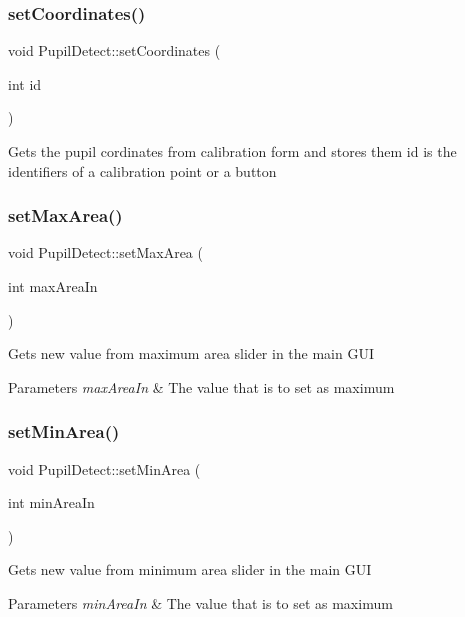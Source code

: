 \subsubsection{\texorpdfstring{set\+Coordinates()}{setCoordinates()}}
{\footnotesize\ttfamily void Pupil\+Detect\+::set\+Coordinates (\begin{DoxyParamCaption}\item[{int}]{id }\end{DoxyParamCaption})}

Gets the pupil cordinates from calibration form and stores them id is the identifiers of a calibration point or a button \mbox{\label{class_pupil_detect_a38b91dc58b1a408e7ca081dac2c208bb}} 
\subsubsection{\texorpdfstring{set\+Max\+Area()}{setMaxArea()}}
{\footnotesize\ttfamily void Pupil\+Detect\+::set\+Max\+Area (\begin{DoxyParamCaption}\item[{int}]{max\+Area\+In }\end{DoxyParamCaption})}

Gets new value from maximum area slider in the main G\+UI 
\begin{DoxyParams}{Parameters}
{\em max\+Area\+In} & The value that is to set as maximum \\
\hline
\end{DoxyParams}
\mbox{\label{class_pupil_detect_aa933cccabd0866e4fa1aee000532cb29}} 
\subsubsection{\texorpdfstring{set\+Min\+Area()}{setMinArea()}}
{\footnotesize\ttfamily void Pupil\+Detect\+::set\+Min\+Area (\begin{DoxyParamCaption}\item[{int}]{min\+Area\+In }\end{DoxyParamCaption})}

Gets new value from minimum area slider in the main G\+UI 
\begin{DoxyParams}{Parameters}
{\em min\+Area\+In} & The value that is to set as maximum \\
\hline
\end{DoxyParams}
\mbox{\label{class_pupil_detect_a116fb58487a120ee59642c6e97d77134}} 
